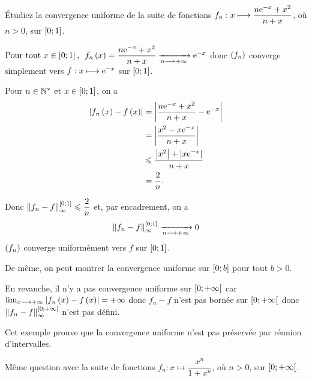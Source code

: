 \begin{exo}
Étudiez la convergence uniforme de la suite de fonctions \(f_n:x\longmapsto\dfrac{n\mathrm{e}^{-x}+x^2}{n+x}\), où \(n>0\), sur \(\left[0;1\right]\).
\end{exo}

\begin{corr}
\(\quantifs{\Tpt x\in\intervii{0}{1}}f_n\paren{x}=\dfrac{n\e{-x}+x^2}{n+x}\tendqd{n\to\pinf}\e{-x}\) donc \(\left(f_n\right)\) converge simplement vers \(f:x\longmapsto\mathrm{e}^{-x}\) sur \(\left[0;1\right]\).

Pour \(n\in\mathbb{N}^*\) et \(x\in\left[0;1\right]\), on a \[\begin{aligned}
\left\lvert f_n\left(x\right)-f\left(x\right)\right\rvert&=\left\lvert\dfrac{n\mathrm{e}^{-x}+x^2}{n+x}-\mathrm{e}^{-x}\right\rvert \\
&=\left\lvert\dfrac{x^2-x\mathrm{e}^{-x}}{n+x}\right\rvert \\
&\leqslant\dfrac{\left\lvert x^2\right\rvert+\left\lvert x\mathrm{e}^{-x}\right\rvert}{n+x} \\
&=\dfrac{2}{n}.
\end{aligned}\]

Donc \(\norme{f_n-f}_\infty^{\intervii{0}{1}}\leq\dfrac{2}{n}\) et, par encadrement, on a \[\norme{f_n-f}_\infty^{\intervii{0}{1}}\tendqd{n\to\pinf}0\] \ie \(\left(f_n\right)\) converge uniformément vers \(f\) sur \(\left[0;1\right]\).

De même, on peut montrer la convergence uniforme sur \(\left[0;b\right]\) pour tout \(b>0\).

En revanche, il n'y a pas convergence uniforme sur \(\left[0;+\infty\right[\) car \(\lim_{x\longrightarrow+\infty}\left\lvert f_n\left(x\right)-f\left(x\right)\right\rvert=+\infty\) donc \(f_n-f\) n'est pas bornée sur \(\left[0;+\infty\right[\) donc \(\norme{f_n-f}_\infty^{\intervie{0}{\pinf}}\) n'est pas défini.
\end{corr}

\begin{rem}
Cet exemple prouve que la convergence uniforme n'est pas préservée par réunion d'intervalles.
\end{rem}

\begin{exo}
Même question avec la suite de fonctions \(f_n:x\mapsto\dfrac{x^n}{1+x^n}\), où \(n>0\), sur \(\left[0;+\infty\right[\).
\end{exo}

